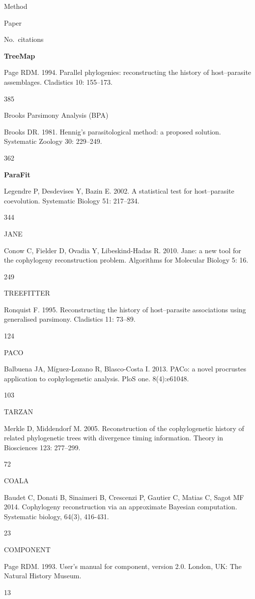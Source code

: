 \documentclass[
]{article}
\begin{document}
Method

Paper

No.~citations

\textbf{TreeMap}

Page RDM. 1994. Parallel phylogenies: reconstructing the history of
host--parasite assemblages. Cladistics 10: 155--173.

385

Brooks Parsimony Analysis (BPA)

Brooks DR. 1981. Hennig's parasitological method: a proposed solution.
Systematic Zoology 30: 229--249.

362

\textbf{ParaFit}

Legendre P, Desdevises Y, Bazin E. 2002. A statistical test for
host--parasite coevolution. Systematic Biology 51: 217--234.

344

JANE

Conow C, Fielder D, Ovadia Y, Libeskind-Hadas R. 2010. Jane: a new tool
for the cophylogeny reconstruction problem. Algorithms for Molecular
Biology 5: 16.

249

TREEFITTER

Ronquist F. 1995. Reconstructing the history of host--parasite
associations using generalised parsimony. Cladistics 11: 73--89.

124

PACO

Balbuena JA, Míguez-Lozano R, Blasco-Costa I. 2013. PACo: a novel
procrustes application to cophylogenetic analysis. PloS one.
8(4):e61048.

103

TARZAN

Merkle D, Middendorf M. 2005. Reconstruction of the cophylogenetic
history of related phylogenetic trees with divergence timing
information. Theory in Biosciences 123: 277--299.

72

COALA

Baudet C, Donati B, Sinaimeri B, Crescenzi P, Gautier C, Matias C, Sagot
MF 2014. Cophylogeny reconstruction via an approximate Bayesian
computation. Systematic biology, 64(3), 416-431.

23

COMPONENT

Page RDM. 1993. User's manual for component, version 2.0. London, UK:
The Natural History Museum.

13
\end{document}
